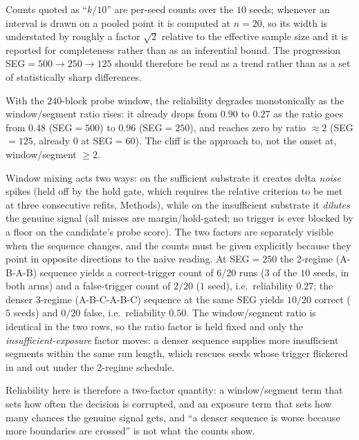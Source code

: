\documentclass[preprint,12pt]{elsarticle}
\begin{document}
Counts quoted as ``$k/10$'' are per-seed counts over the $10$
seeds; whenever an interval is drawn on a pooled point it is computed at
$n=20$, so its width is understated by roughly a factor $\sqrt2$ relative to
the effective sample size and it is reported for completeness rather than as
an inferential bound. The progression
SEG$=500\to250\to125$ should therefore be read as a trend rather than as a set of
statistically sharp differences.

With the $240$-block probe window, the
reliability degrades monotonically as the window/segment ratio rises:
it already drops from $0.90$ to $0.27$ as the ratio goes from $0.48$
(SEG$=500$) to $0.96$ (SEG$=250$), and reaches zero by ratio $\approx2$
(SEG$=125$, already $0$ at SEG$=60$). The cliff is the approach to,
not the onset at, window/segment $\geq2$.

Window mixing acts two ways: on the sufficient substrate it creates delta
\emph{noise} spikes (held off by the hold gate, which requires the relative
criterion to be met at three consecutive refits, Methods), while on the
insufficient substrate it \emph{dilutes} the genuine signal (all misses are
margin/hold-gated; no trigger is ever blocked by a floor on the candidate's
probe score). The two factors are separately visible when the sequence
changes, and the counts must be given explicitly because they point in
opposite directions to the naive reading. At SEG$=250$ the 2-regime (A-B-A-B)
sequence yields a correct-trigger count of $6/20$ runs ($3$ of the $10$ seeds,
in both arms) and a false-trigger count of $2/20$ ($1$ seed), i.e.\ reliability
$0.27$; the denser 3-regime (A-B-C-A-B-C) sequence at the same SEG yields
$10/20$ correct ($5$ seeds) and $0/20$ false, i.e.\ reliability $0.50$. The
window/segment ratio is identical in the two rows, so the ratio factor is held
fixed and only the \emph{insufficient-exposure} factor moves: a denser
sequence supplies more insufficient segments within the same run length, which
rescues seeds whose trigger flickered in and out under the 2-regime schedule.

Reliability here is therefore a two-factor quantity: a window/segment term
that sets how often the decision is corrupted, and an exposure term that sets
how many chances the genuine signal gets, and ``a denser sequence is worse
because more boundaries are crossed'' is not what the counts show.
\end{document}
